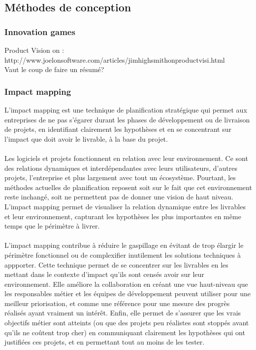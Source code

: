 	\newpage
	\subsection{Méthodes de conception}
		
		\subsubsection{Innovation games}
	Product Vision on : \\	
	http://www.joelonsoftware.com/articles/jimhighsmithonproductvisi.html \\
	Vaut le coup de faire un résumé?	
		\subsubsection{Impact mapping}
L'impact mapping est une technique de planification stratégique qui permet aux entreprises de ne pas s'égarer durant les phases de développement ou de livraison de projets, en identifiant clairement les hypothèses et en se concentrant sur l'impact que doit avoir le livrable, à la base du projet.

\paragraph{}
Les logiciels et projets fonctionnent en relation avec leur environnement. Ce sont des relations dynamiques et interdépendantes avec leurs utilisateurs, d'autres projets, l'entreprise et plus largement avec tout un écosystème. Pourtant, les méthodes actuelles de planification reposent soit sur le fait que cet environnement reste inchangé, soit ne permettent pas de donner une vision de haut niveau. L'impact mapping permet de visualiser la relation dynamique entre les livrables et leur environnement, capturant les hypothèses les plus importantes en même temps que le périmètre à livrer\cite{Adzi12}.		

\paragraph{}L'impact mapping contribue à réduire le gaspillage en évitant de trop élargir le périmètre fonctionnel ou de complexifier inutilement les solutions techniques à appporter. Cette technique permet de se concentrer sur les livrables en les mettant dans le contexte d'impact qu'ils sont censés avoir sur leur environnement. Elle améliore la collaboration en créant une vue haut-niveau que les responsables métier et les équipes de développement peuvent utiliser pour une meilleur priorisation, et comme une référence pour une mesure des progrès réalisés ayant vraiment un intérêt. Enfin, elle permet de s'assurer que les vrais objectifs métier sont atteints (ou que des projets peu réalistes sont stoppés avant qu'ils ne coûtent trop cher) en communiquant clairement les hypothèses qui ont justifiées ces projets, et en permettant tout au moins de les tester.

